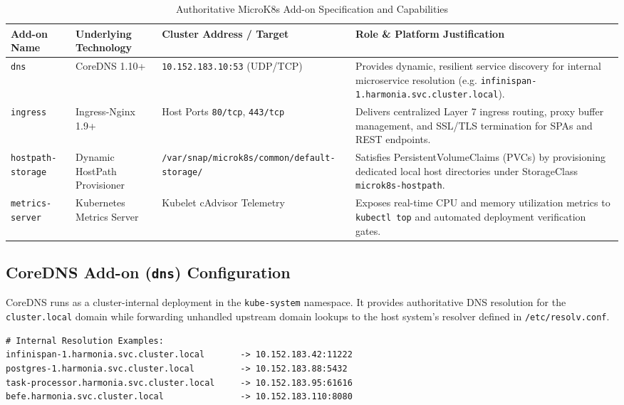 \begin{table}[htbp]
\centering
\small
\begin{tabularx}{\textwidth}{l p{2.8cm} p{3.2cm} X}
\toprule
\textbf{Add-on Name} & \textbf{Underlying Technology} & \textbf{Cluster Address / Target} & \textbf{Role \& Platform Justification} \\
\midrule
\texttt{dns} & CoreDNS 1.10+ & \texttt{10.152.183.10:53} (UDP/TCP) & Provides dynamic, resilient service discovery for internal microservice resolution (e.g. \texttt{infinispan-1.harmonia.svc.cluster.local}). \\
\addlinespace
\texttt{ingress} & Ingress-Nginx 1.9+ & Host Ports \texttt{80/tcp}, \texttt{443/tcp} & Delivers centralized Layer 7 ingress routing, proxy buffer management, and SSL/TLS termination for SPAs and REST endpoints. \\
\addlinespace
\texttt{hostpath-storage} & Dynamic HostPath Provisioner & \texttt{/var/snap/microk8s/common/default-storage/} & Satisfies PersistentVolumeClaims (PVCs) by provisioning dedicated local host directories under StorageClass \texttt{microk8s-hostpath}. \\
\addlinespace
\texttt{metrics-server} & Kubernetes Metrics Server & Kubelet cAdvisor Telemetry & Exposes real-time CPU and memory utilization metrics to \texttt{kubectl top} and automated deployment verification gates. \\
\bottomrule
\end{tabularx}
\caption{Authoritative MicroK8s Add-on Specification and Capabilities}
\label{tab:microk8s_addons}
\end{table}

\subsection{CoreDNS Add-on (\texttt{dns}) Configuration}

CoreDNS runs as a cluster-internal deployment in the \texttt{kube-system} namespace. It provides authoritative DNS resolution for the \texttt{cluster.local} domain while forwarding unhandled upstream domain lookups to the host system's resolver defined in \texttt{/etc/resolv.conf}.

\begin{lstlisting}[language=XML, caption={CoreDNS Upstream Forwarding and Service Resolution Scheme}, label={lst:coredns_config}]
# Internal Resolution Examples:
infinispan-1.harmonia.svc.cluster.local       -> 10.152.183.42:11222
postgres-1.harmonia.svc.cluster.local         -> 10.152.183.88:5432
task-processor.harmonia.svc.cluster.local     -> 10.152.183.95:61616
befe.harmonia.svc.cluster.local               -> 10.152.183.110:8080
\end{lstlisting}

